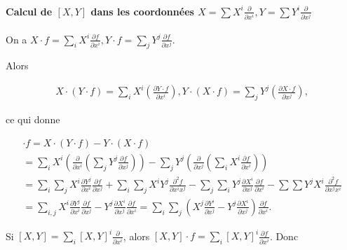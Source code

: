 \documentclass[french]{article}
\theoremstyle{definition}
\begin{document}
\paragraph{Calcul de \([X,Y]\) dans les coordonnées \(X = \displaystyle\sum X ^{i}\displaystyle\frac{\partial  }{\partial x ^{i}}, Y =  \displaystyle\sum Y ^{i}\displaystyle\frac{\partial  }{\partial x ^{j}}\)}


On a \(X \cdot f = \displaystyle \sum_{i}^{} X ^{i} \displaystyle \frac{\partial f }{\partial x ^{i}}, Y \cdot f = \displaystyle \sum_{j}^{} Y ^{j} \displaystyle \frac{\partial f }{\partial x ^{j}}\).

Alors

\begin{gather*}
  X \cdot (Y \cdot f) = \sum_{i} X ^{i} \left(\frac{\partial Y \cdot f }{\partial x ^{i}} \right), Y \cdot(X \cdot f) = \sum_{j} Y ^{j} \left(\frac{\partial X \cdot f }{\partial x ^{j}} \right),
\end{gather*}

ce qui donne

\begin{gather*}
  [X \cdot Y] \cdot f = X \cdot (Y \cdot f) - Y \cdot (X \cdot f) \\
  = \sum_{i}^{} X ^{i}\left(\frac{\partial  }{\partial x ^{i}} \left(\sum_{j} Y ^{j}\frac{\partial f }{\partial x ^{j}}  \right)\right) - \sum_{j} Y^{j}\left(\frac{\partial  }{\partial x ^{j}} \left(\sum_{i} X^{i}\frac{\partial f }{\partial x^{i}}  \right)\right) \\
  = \sum_{i}\sum_{j} X ^{i} \frac{\partial Y ^{j} }{\partial x ^{i}} \frac{\partial f }{\partial x ^{j}} + \sum_{i}\sum_{j} X ^{i} Y ^{j} \frac{\partial ^2 f }{\partial x ^{i} x ^{j}} - \sum_{j}\sum_{i} Y^{j} \frac{\partial X^{i} }{\partial x ^{j}} \frac{\partial f }{\partial x^{i}} - \sum\sum Y^{j} X^{i} \frac{\partial ^2 f }{\partial x^{j} x^{i}} \\
  = \sum_{i,j} X ^{i} \frac{\partial Y ^{j} }{\partial x ^{i}} \frac{\partial f }{\partial x ^{j}} - Y ^{j} \frac{\partial X ^{i} }{\partial x ^{j}} \frac{\partial f }{\partial x ^{i}}  = \sum_{i} \sum_{j} \left(X ^{j}\frac{\partial Y ^{i} }{\partial x ^{j}} - Y ^{j} \frac{\partial X ^{i} }{\partial x ^{j}} \right)  \frac{\partial f }{\partial x^{i}}.
\end{gather*}

Si \([X,Y] = \displaystyle \sum_{i} [X,Y]^{i}\displaystyle\frac{\partial  }{\partial x ^{i}}\), alors \([X,Y]\cdot f = \displaystyle \sum_{i}[X,Y]^{i}\displaystyle\frac{\partial f }{\partial x ^{i}}\). Donc
\end{document}
